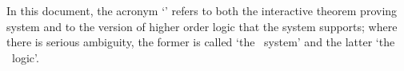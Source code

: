 In this document, the acronym `\HOL' refers to both the interactive theorem
proving system and to the version of higher order logic that the system
supports; where there is serious ambiguity, the former is called `the \HOL\
system' and the latter `the \HOL\ logic'.


